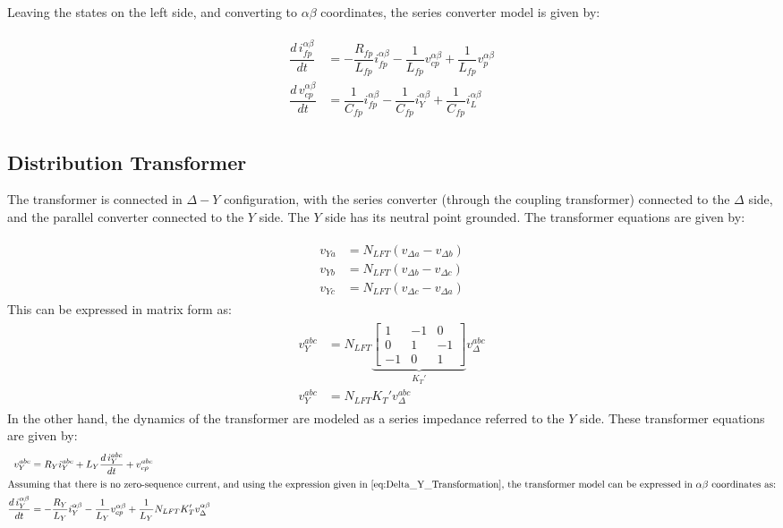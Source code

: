 Leaving the states on the left side, and converting to $\alpha\beta$ coordinates, the series converter model is given by:

\begin{align}
    \begin{aligned}
        \dfrac{d\,i_{fp}^{\alpha\beta}}{dt} &= -\dfrac{R_{fp}}{L_{fp}}i_{fp}^{\alpha\beta} - \dfrac{1}{L_{fp}}v_{cp}^{\alpha\beta} + \dfrac{1}{L_{fp}}v_p^{\alpha\beta} \\
        \dfrac{d\,v_{cp}^{\alpha\beta}}{dt} &= \dfrac{1}{C_{fp}}i_{fp}^{\alpha\beta} - \dfrac{1}{C_{fp}}i_Y^{\alpha\beta} + \dfrac{1}{C_{fp}}i_L^{\alpha\beta}
    \end{aligned}
\end{align}

\subsection{Distribution Transformer}

The transformer is connected in $\Delta-Y$ configuration, with the series converter (through the coupling transformer) connected to the $\Delta$ side, and the parallel converter connected to the $Y$ side. The $Y$ side has its neutral point grounded. The transformer equations are given by:

\begin{align}
    \begin{aligned}
        v_{Ya} &= N_{LFT}(v_{\Delta a} - v_{\Delta b}) \\
        v_{Yb} &= N_{LFT}(v_{\Delta b} - v_{\Delta c}) \\
        v_{Yc} &= N_{LFT}(v_{\Delta c} - v_{\Delta a})
    \end{aligned}
\end{align}
This can be expressed in matrix form as:
\begin{align}
    \begin{aligned}
        v_Y^{abc} &= N_{LFT}
        \underbrace{
        \begin{bmatrix}
            1 & -1 & 0 \\
            0 & 1 & -1 \\
            -1 & 0 & 1
        \end{bmatrix}
        }_{K_T'}
        v_{\Delta}^{abc}\\
        v_Y^{abc} &= N_{LFT} K_T' v_{\Delta}^{abc} \label{eq:Delta_Y_Transformation}
    \end{aligned}
\end{align}
In the other hand, the dynamics of the transformer are modeled as a series impedance referred to the $Y$ side. These transformer equations are given by:
\begin{align}
    v_{Y}^{abc} &= R_Yi_Y^{abc} + L_Y\dfrac{d\,i_Y^{abc}}{dt} + v_{cp}^{abc} \\
    \intertext{Assuming that there is no zero-sequence current, and using the expression given in \eqref{eq:Delta_Y_Transformation}, the transformer model can be expressed in $\alpha\beta$ coordinates as:}
    \dfrac{d\,i_Y^{\alpha\beta}}{dt} &= -\dfrac{R_Y}{L_Y}i_Y^{\alpha\beta} - \dfrac{1}{L_Y}v_{cp}^{\alpha\beta} + \dfrac{1}{L_Y}N_{LFT}K_T'v_{\Delta}^{\alpha\beta}
\end{align}

